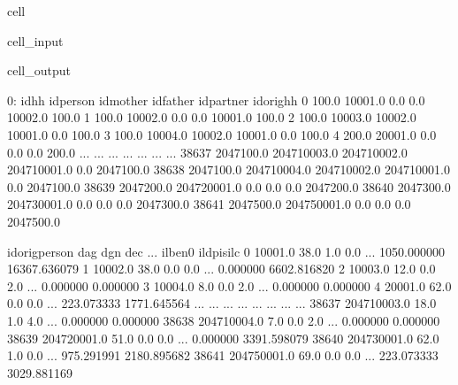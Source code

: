 \documentclass[letterpaper,10pt,english]{sphinxmanual}
\begin{document}
\begin{sphinxuseclass}{cell}
\begin{sphinxuseclass}{cell_input}
\begin{sphinxVerbatim}[commandchars=\\\{\}]
\PYG{p}{[}\PYG{p}{]}
\end{sphinxVerbatim}

\end{sphinxuseclass}
\begin{sphinxuseclass}{cell_output}
\begin{sphinxVerbatim}[commandchars=\\\{\}]
0:             idhh     idperson     idmother     idfather  idpartner   idorighh  \PYGZbs{}
0          100.0      10001.0          0.0          0.0    10002.0      100.0   
1          100.0      10002.0          0.0          0.0    10001.0      100.0   
2          100.0      10003.0      10002.0      10001.0        0.0      100.0   
3          100.0      10004.0      10002.0      10001.0        0.0      100.0   
4          200.0      20001.0          0.0          0.0        0.0      200.0   
...          ...          ...          ...          ...        ...        ...   
38637  2047100.0  204710003.0  204710002.0  204710001.0        0.0  2047100.0   
38638  2047100.0  204710004.0  204710002.0  204710001.0        0.0  2047100.0   
38639  2047200.0  204720001.0          0.0          0.0        0.0  2047200.0   
38640  2047300.0  204730001.0          0.0          0.0        0.0  2047300.0   
38641  2047500.0  204750001.0          0.0          0.0        0.0  2047500.0   

       idorigperson   dag  dgn  dec  ...      il\PYGZus{}ben0    il\PYGZus{}dpisilc  \PYGZbs{}
0           10001.0  38.0  1.0  0.0  ...  1050.000000  16367.636079   
1           10002.0  38.0  0.0  0.0  ...     0.000000   6602.816820   
2           10003.0  12.0  0.0  2.0  ...     0.000000      0.000000   
3           10004.0   8.0  0.0  2.0  ...     0.000000      0.000000   
4           20001.0  62.0  0.0  0.0  ...   223.073333   1771.645564   
...             ...   ...  ...  ...  ...          ...           ...   
38637   204710003.0  18.0  1.0  4.0  ...     0.000000      0.000000   
38638   204710004.0   7.0  0.0  2.0  ...     0.000000      0.000000   
38639   204720001.0  51.0  0.0  0.0  ...     0.000000   3391.598079   
38640   204730001.0  62.0  1.0  0.0  ...   975.291991   2180.895682   
38641   204750001.0  69.0  0.0  0.0  ...   223.073333   3029.881169   


\end{sphinxVerbatim}
\end{sphinxuseclass}
\end{sphinxuseclass}
\end{document}

